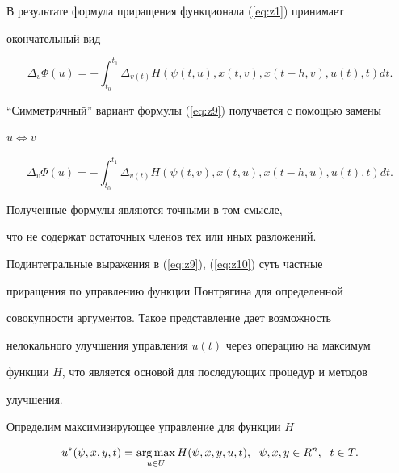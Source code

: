 В результате формула приращения функционала (\ref{eq:z1}) принимает


окончательный вид


\begin{equation}


\Delta_v\Phi(u)=-\int_{t_0}^{t_1}


\Delta_{v(t)}H(\psi(t,u),x(t,v),x(t-h,v),u(t),t)dt.


\label{eq:z9}


\end{equation}


``Симметричный'' вариант формулы (\ref{eq:z9}) получается с помощью замены


$u\Leftrightarrow v$


\begin{equation}


\Delta_v\Phi(u)=-\int_{t_0}^{t_1}


\Delta_{v(t)}H(\psi(t,v),x(t,u),x(t-h,u),u(t),t)dt.


\label{eq:z10}


\end{equation}





Полученные формулы являются точными в том смысле,


что не содержат остаточных членов тех или иных разложений.





Подинтегральные выражения в (\ref{eq:z9}), (\ref{eq:z10}) суть частные


приращения по управлению функции Понтрягина для определенной


совокупности аргументов. Такое представление дает возможность


нелокального улучшения управления $u(t)$ через операцию на максимум


функции $H$, что является основой для последующих процедур и методов


улучшения.





Определим максимизирующее управление для функции $H$


\begin{equation}


u^*(\psi,x,y,t)=\argmax_{u\in U}


H(\psi,x,y,u,t),\ \;\psi,x,y\in R^n,\ \;t\in T.


\label{eq:z15}


\end{equation}





